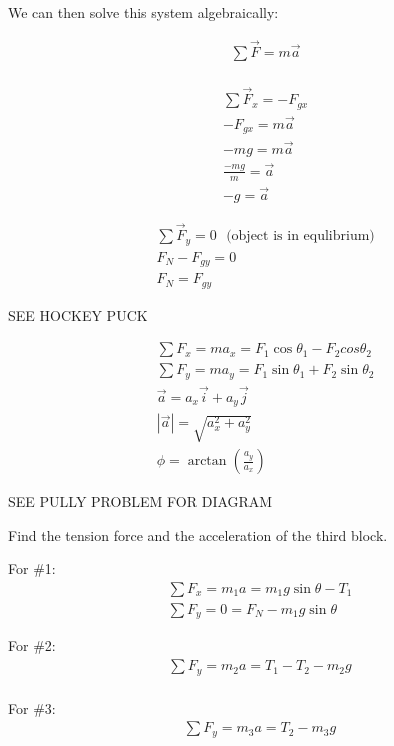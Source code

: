 We can then solve this system algebraically:

$$
	\begin{aligned}
		&\sum \vec F = m\vec{a}\\
	\end{aligned}
$$

$$
	\begin{aligned}
		&\sum \vec F_x = -F_{gx}\\
		&-F_{gx} = m\vec{a}\\
		&-mg = m\vec{a}\\
		&\frac{-mg}{m} = \vec{a}\\
		&{-g} = \vec{a}
	\end{aligned}
$$

$$
	\begin{aligned}
		&\sum \vec F_y = 0 \:\:\: \text{(object is in equlibrium)}\\
		&F_{N} - F_{gy} = 0\\
		&F_N = F_{gy}
	\end{aligned}
$$

\begin{problem}
	SEE HOCKEY PUCK

	$$
		\begin{aligned}
			&\sum F_x = ma_x = F_1\cos\theta_1 - F_2cos\theta_2\\
			&\sum F_y = ma_y = F_1\sin\theta_1 + F_2\sin\theta_2\\
			&\vec a = a_x \vec i + a_y \vec j\\
			&|\vec a| = \sqrt{a_x^2 + a_y^2}\\
			&\phi = \arctan\left(\frac{a_y}{a_x}\right)
		\end{aligned}
	$$
\end{problem}

\begin{problem}
	SEE PULLY PROBLEM FOR DIAGRAM

	Find the tension force and the acceleration of the third block.

	For \#1:
	$$
		\begin{aligned}
			\sum F_x = m_1a = m_1g\sin\theta - T_1\\
			\sum F_y = 0 = F_N - m_1g\sin\theta
		\end{aligned}
	$$

	For \#2:
	$$
		\begin{aligned}
			\sum F_y = m_2a = T_1 - T_2 - m_2g\\
		\end{aligned}
	$$


	For \#3:
	$$
		\begin{aligned}
			\sum F_y = m_3a = T_2 - m_3g
		\end{aligned}
	$$
\end{problem}


